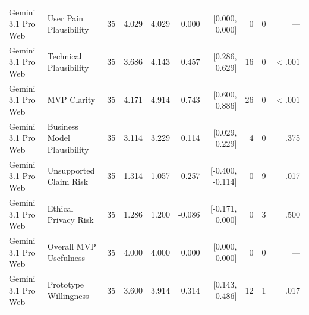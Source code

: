 \documentclass[10pt]{article}
\begin{document}
\begin{landscape}
\begin{longtable}{llrrrrrrrr}
Gemini 3.1 Pro Web & User Pain Plausibility & 35 & 4.029 & 4.029 & 0.000 & [0.000, 0.000] & 0 & 0 & — \\
Gemini 3.1 Pro Web & Technical Plausibility & 35 & 3.686 & 4.143 & 0.457 & [0.286, 0.629] & 16 & 0 & $<.001$ \\
Gemini 3.1 Pro Web & MVP Clarity & 35 & 4.171 & 4.914 & 0.743 & [0.600, 0.886] & 26 & 0 & $<.001$ \\
Gemini 3.1 Pro Web & Business Model Plausibility & 35 & 3.114 & 3.229 & 0.114 & [0.029, 0.229] & 4 & 0 & .375 \\
Gemini 3.1 Pro Web & Unsupported Claim Risk & 35 & 1.314 & 1.057 & -0.257 & [-0.400, -0.114] & 0 & 9 & .017 \\
Gemini 3.1 Pro Web & Ethical Privacy Risk & 35 & 1.286 & 1.200 & -0.086 & [-0.171, 0.000] & 0 & 3 & .500 \\
Gemini 3.1 Pro Web & Overall MVP Usefulness & 35 & 4.000 & 4.000 & 0.000 & [0.000, 0.000] & 0 & 0 & — \\
Gemini 3.1 Pro Web & Prototype Willingness & 35 & 3.600 & 3.914 & 0.314 & [0.143, 0.486] & 12 & 1 & .017 \\
\end{longtable}
\end{landscape}
\end{document}
